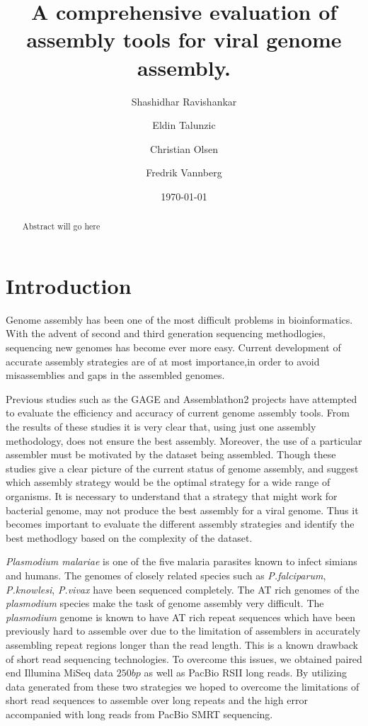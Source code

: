\documentclass[12pt, a4paper]{article}
\begin{document}
\title{A comprehensive evaluation of assembly tools for viral genome assembly.}
\author{Shashidhar Ravishankar \and Eldin Talunzic \and Christian Olsen \and Fredrik Vannberg}
\date{\today}
\maketitle

\begin{abstract}
Abstract will go here
\end{abstract}

\section*{Introduction}
Genome assembly has been one of the most difficult problems in bioinformatics. With the advent of second and third generation sequencing methodlogies, sequencing new genomes has become ever more easy. Current development of accurate assembly strategies are of at most importance,in order to avoid misassemblies and gaps in the assembled genomes.

Previous studies such as the GAGE and Assemblathon2 projects have attempted to evaluate the efficiency and accuracy of current genome assembly tools. From the results of these studies it is very clear that, using just one assembly methodology, does not ensure the best assembly. Moreover, the use of a particular assembler must be motivated by the dataset being assembled. Though these studies give a clear picture of the current status of genome assembly, and suggest which assembly strategy would be the optimal strategy for a wide range of organisms. It is necessary to understand that a strategy that might work for bacterial genome, may not produce the best assembly for a viral genome. Thus it becomes important to evaluate the different assembly strategies and identify the best methodlogy based on the complexity of the dataset.

{\it Plasmodium malariae} is one of the five malaria parasites known to infect simians and humans. The genomes of closely related species such as {\it P.falciparum}, {\it P.knowlesi}, {\it P.vivax} have been sequenced completely. The AT rich genomes of the {\it plasmodium} species make the task of genome assembly very difficult. The {\it plasmodium} genome is known to have AT rich repeat sequences which have been previously hard to assemble over due to the limitation of assemblers in accurately assembling repeat regions longer than the read length. This is a known drawback of short read sequencing technologies. To overcome this issues, we obtained paired end Illumina MiSeq data \(250 bp\) as well as PacBio RSII long reads. By utilizing data generated from these two strategies we hoped to overcome the limitations of short read sequences to assemble over long repeats and the high error accompanied with long reads from PacBio SMRT sequencing.
\end{document}

